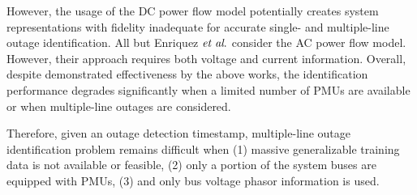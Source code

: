 However, the usage of the DC power flow model potentially creates system representations with fidelity inadequate for accurate single- and multiple-line outage identification. All but Enriquez $\textit{et al}.$ consider the AC power flow model. However, their approach requires both voltage and current information. Overall, despite demonstrated effectiveness by the above works, the identification performance degrades significantly when a limited number of PMUs are available or when multiple-line outages are considered. 


Therefore, given an outage detection timestamp, multiple-line outage identification problem remains difficult when (1) massive generalizable training data is not available or feasible, (2) only a portion of the system buses are equipped with PMUs, (3) and only bus voltage phasor information is used.  
